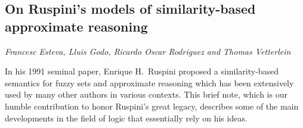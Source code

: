 \documentclass[../booklet.tex]{subfiles}
\begin{document}
\subsection[On Ruspini's models of similarity-based approximate reasoning. {\it Francesc Esteva, Lluis Godo, Ricardo Oscar Rodriguez and Thomas Vetterlein}]{On Ruspini's models of similarity-based approximate reasoning}
   

\begin{center}
  {\it Francesc Esteva, Lluis Godo, Ricardo Oscar Rodriguez and Thomas Vetterlein}
\end{center}

\vskip 0.8cm


%
In his 1991 seminal paper, Enrique H.\ Ruspini proposed a similarity-based semantics for fuzzy sets and approximate reasoning which has been extensively used by many other authors in various contexts. This brief note, which is our humble contribution to honor Ruspini's great legacy, describes some of the main developments in the field of logic that essentially rely on his ideas.
%
\end{document}
